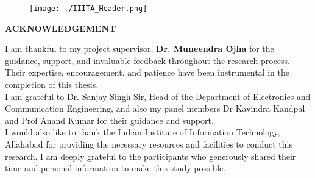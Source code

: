\begin{spacing}{2.0}
\begin{flushright}
\begin{minipage}{0.5\textwidth}
\newpage
{}

\newpage
\begin{figure}[htp]
    \texttt{[image: ./IIITA\_Header.png]}
\end{figure}
\thispagestyle{empty}
\vspace{1mm}

\begin{center}
    {\large\bfseries ACKNOWLEDGEMENT}
\end{center}

\begin{spacing}{1.5}
I am thankful to my project supervisor, \textbf{Dr. Muneendra Ojha} for the guidance, support, and invaluable feedback throughout the research process. Their expertise, encouragement, and patience have been instrumental in the completion of this thesis.\\[10pt] 
 I am grateful to Dr. Sanjay Singh Sir, Head of the Department of Electronics and Communication Engineering, and also my panel members Dr Kavindra Kandpal and Prof Anand Kumar for their guidance and support.\\[10pt]
 I would also like to thank the Indian Institute of Information Technology, Allahabad for providing the necessary resources and facilities to conduct this research. I am deeply grateful to the participants who generously shared their time and personal information to make this study possible. \\[30 pt]
\end{spacing}

\begin{spacing}{2.0}
\begin{flushright}
    \begin{minipage}{0.5\textwidth}
        \flushright \vspace{60 pt}
        \underline{\hspace{6cm}} \\
         \\[80pt]
    \end{minipage}
\end{flushright}
\end{spacing}
\newpage



\end{minipage}
\end{flushright}
\end{spacing}

